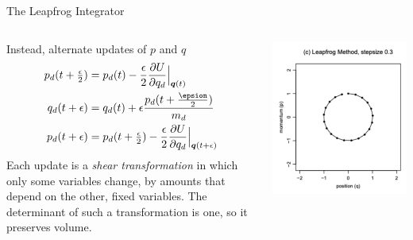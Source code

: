 \documentclass[aspectratio=169]{beamer}
\begin{document}
\begin{frame}{The Leapfrog Integrator}

\begin{columns}
\begin{column}{.66\textwidth}
Instead, alternate updates of $p$ and $q$
\begin{align}
    p_d(t+\tfrac{\epsilon}{2}) &= p_d(t) - \frac{\epsilon}{2} \frac{\partial U}{\partial q_d} \Big|_{\mbq(t)} \\
    q_d(t+\epsilon) &= q_d(t) + \epsilon \frac{p_d(t+\tfrac{\epsion}{2})}{m_d} \\
    p_d(t+\epsilon) &= p_d(t + \tfrac{\epsilon}{2}) - \frac{\epsilon}{2} \frac{\partial U}{\partial q_d} \Big|_{\mbq(t + \epsilon)} \\
\end{align}
Each update is a \textit{shear transformation} in which only some variables change, by amounts that depend on the other, fixed variables. The determinant of such a transformation is one, so it preserves volume.
\end{column}

\begin{column}{.33\textwidth}
\centering
\includegraphics[width=\textwidth]{figures/lap3/leapfrog.pdf}
\end{column}
\end{columns}
    
\end{frame}
\end{document}
